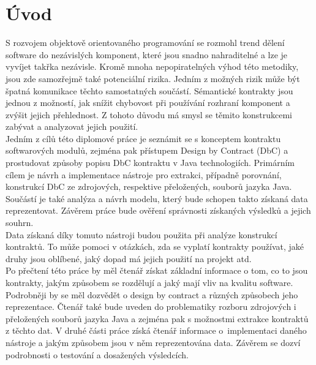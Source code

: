 \chapter{Úvod}

S rozvojem objektově orientovaného programování se rozmohl trend dělení software do nezávislých komponent, které jsou snadno nahraditelné a lze je vyvíjet takřka nezávisle. Kromě mnoha nepopiratelných výhod této metodiky, jsou zde samozřejmě také potenciální rizika. Jedním z možných rizik může být špatná komunikace těchto samostatných součástí. Sémantické kontrakty jsou jednou z možností, jak snížit chybovost při používání rozhraní komponent a zvýšit jejich přehlednost. Z tohoto důvodu má smysl se těmito konstrukcemi zabývat a analyzovat jejich použití.\\

Jedním z cílů této diplomové práce je seznámit se s konceptem kontraktu softwarových modulů, zejména pak přístupem Design by Contract (DbC) a prostudovat způsoby popisu DbC kontraktu v Java technologiích. Primárním cílem je návrh a implementace nástroje pro extrakci, případně porovnání, konstrukcí DbC ze zdrojových, respektive přeložených, souborů jazyka Java. Součástí je také analýza a návrh modelu, který bude schopen takto získaná data reprezentovat. Závěrem práce bude ověření správnosti získaných výsledků a jejich souhrn.\\ 

Data získaná díky tomuto nástroji budou použita při analýze konstrukcí kontraktů. To může pomoci v otázkách, zda se vyplatí kontrakty používat, jaké druhy jsou oblíbené, jaký dopad má jejich použití na projekt atd.\\

Po přečtení této práce by měl čtenář získat základní informace o tom, co to jsou kontrakty, jakým způsobem se rozdělují a jaký mají vliv na kvalitu software. Podrobněji by se měl dozvědět o design by contract a různých způsobech jeho reprezentace. Čtenář také bude uveden do problematiky rozboru zdrojových i přeložených souborů jazyka Java a zejména pak s možnostmi extrakce kontraktů z těchto dat. V druhé části práce získá čtenář informace o~implementaci daného nástroje a jakým způsobem jsou v něm reprezentována data. Závěrem se dozví podrobnosti o testování a dosažených výsledcích.